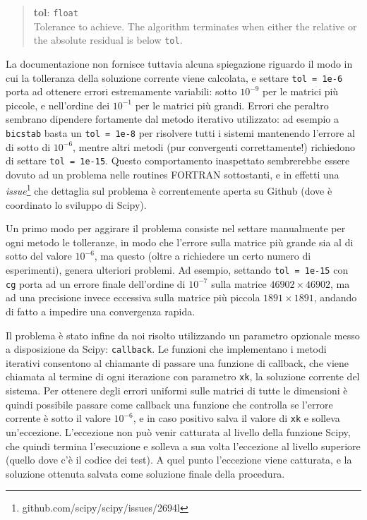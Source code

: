 \documentclass[11pt,a4paper]{scrartcl}
\begin{document}
\begin{quote}
\textbf{tol}: \texttt{float} \\
Tolerance to achieve. The algorithm terminates when either the relative or the absolute residual is below \texttt{tol}.
\end{quote}

La documentazione non fornisce tuttavia alcuna spiegazione riguardo il modo in cui la tolleranza della soluzione corrente viene calcolata, e settare \texttt{tol = 1e-6} porta ad ottenere errori estremamente variabili: sotto $10^{-9}$ per le matrici più piccole, e nell'ordine dei $10^{-1}$ per le matrici più grandi. Errori che peraltro sembrano dipendere fortamente dal metodo iterativo utilizzato: ad esempio a \texttt{bicstab} basta un \texttt{tol = 1e-8} per risolvere tutti i sistemi mantenendo l'errore al di sotto di $10^{-6}$, mentre altri metodi (pur convergenti correttamente!) richiedono di settare \texttt{tol = 1e-15}. Questo comportamento inaspettato sembrerebbe essere dovuto ad un problema nelle routines FORTRAN sottostanti, e in effetti una \emph{issue}\footnote{github.com/scipy/scipy/issues/2694l} che dettaglia sul problema è correntemente aperta su Github (dove è coordinato lo sviluppo di Scipy).

Un primo modo per aggirare il problema consiste nel settare manualmente per ogni metodo le tolleranze, in modo che l'errore sulla matrice più grande sia al di sotto del valore $10^{-6}$, ma questo (oltre a richiedere un certo numero di esperimenti), genera ulteriori problemi. Ad esempio, settando \texttt{tol = 1e-15} con \texttt{cg} porta ad un errore finale dell'ordine di $10^{-7}$ sulla matrice $46902 \times 46902$, ma ad una precisione invece eccessiva sulla matrice più piccola $1891 \times 1891$, andando di fatto a impedire una convergenza rapida.

Il problema è stato infine da noi risolto utilizzando un parametro opzionale messo a disposizione da Scipy: \texttt{callback}. Le funzioni che implementano i metodi iterativi consentono al chiamante di passare una funzione di callback, che viene chiamata al termine di ogni iterazione con parametro \texttt{xk}, la soluzione corrente del sistema. Per ottenere degli errori uniformi sulle matrici di tutte le dimensioni è quindi possibile passare come callback una funzione che controlla se l'errore corrente è sotto il valore $10^{-6}$, e in caso positivo salva il valore di \texttt{xk} e solleva un'eccezione. L'eccezione non può venir catturata al livello della funzione Scipy, che quindi termina l'esecuzione e solleva a sua volta l'eccezione al livello superiore (quello dove c'è il codice dei test). A quel punto l'eccezione viene catturata, e la soluzione ottenuta salvata come soluzione finale della procedura.
\end{document}
